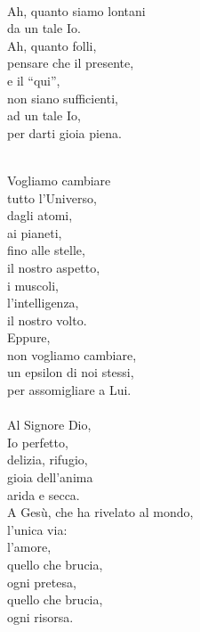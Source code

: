 \begin{haiku}
\leavevmode\\

Ah, quanto siamo lontani\\
da un tale Io.\\
Ah, quanto folli,\\
pensare che il presente,\\
e il ``qui'',\\
non siano sufficienti,\\
ad un tale Io,\\
per darti gioia piena.

\leavevmode\\

Vogliamo cambiare\\
tutto l'Universo,\\
dagli atomi,\\
ai pianeti,\\
fino alle stelle,\\
il nostro aspetto,\\
i muscoli,\\
l'intelligenza,\\
il nostro volto.\\
Eppure,\\
non vogliamo cambiare,\\
un epsilon di noi stessi,\\
per assomigliare a Lui.\\

\leavevmode\\

Al Signore Dio,\\
Io perfetto,\\
delizia, rifugio,\\
gioia dell'anima\\
arida e secca.\\
A Gesù, che ha rivelato al mondo,\\
l'unica via:\\
l'amore,\\
quello che brucia,\\
ogni pretesa,\\
quello che brucia,\\
ogni risorsa.\\

\end{haiku}

